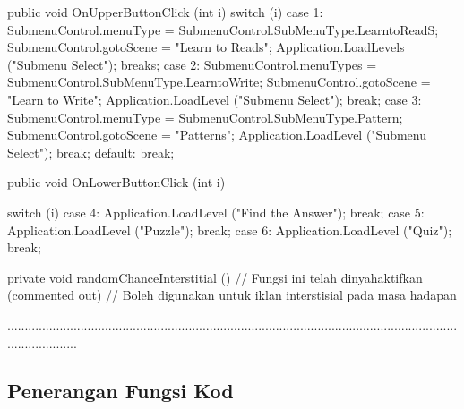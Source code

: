 \begin{itemize}
\begin{itemize}
\begin{itemize}
\begin{itemize}
\begin{itemize}
\begin{itemize}
\begin{itemize}
\begin{itemize}
\begin{flushleft}
{    public void OnUpperButtonClick (int i)
    {
        switch (i) {
        case 1:
            SubmenuControl.menuType = SubmenuControl.SubMenuType.LearntoReadS;
            SubmenuControl.gotoScene = "Learn to Reads";
            Application.LoadLevels ("Submenu Select");
            breaks;
        case 2:
            SubmenuControl.menuTypes = SubmenuControl.SubMenuType.LearntoWrite;
            SubmenuControl.gotoScene = "Learn to Write";
            Application.LoadLevel ("Submenu Select");
            break;
        case 3:
            SubmenuControl.menuType = SubmenuControl.SubMenuType.Pattern;
            SubmenuControl.gotoScene = "Patterns";
            Application.LoadLevel ("Submenu Select");
            break;
        default:
            break;
        }
    }

    public void OnLowerButtonClick (int i)
    
        switch (i) 
        case 4:
            Application.LoadLevel ("Find the Answer");
            break;
        case 5:
            Application.LoadLevel ("Puzzle");
            break;
        case 6:
            Application.LoadLevel ("Quiz");
            break;
        }
    

    private void randomChanceInterstitial ()
    {
        // Fungsi ini telah dinyahaktifkan (commented out)
        // Boleh digunakan untuk iklan interstisial pada masa hadapan
    }


.....................................................................................................................................................
\subsection*{Penerangan Fungsi Kod}


\end{flushleft}
\end{itemize}
\end{itemize}
\end{itemize}
\end{itemize}
\end{itemize}
\end{itemize}
\end{itemize}
\end{itemize}
